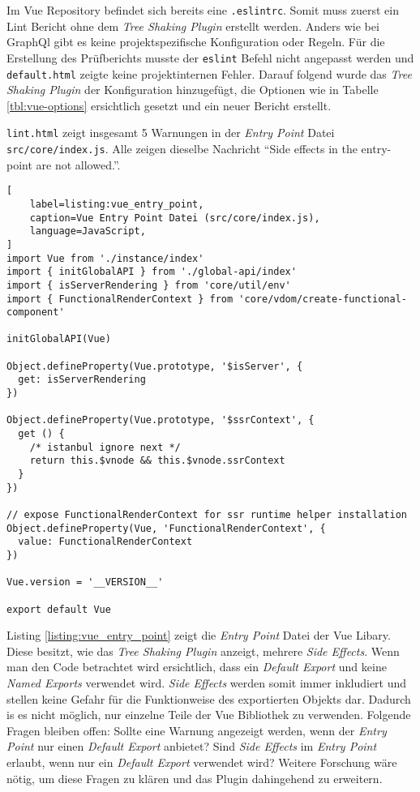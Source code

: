 Im Vue Repository befindet sich bereits eine \lstinline{.eslintrc}. Somit muss zuerst ein Lint Bericht ohne dem \textit{Tree Shaking Plugin} erstellt werden. Anders wie bei GraphQl gibt es keine projektspezifische Konfiguration oder Regeln. Für die Erstellung des Prüfberichts musste der \lstinline{eslint} Befehl nicht angepasst werden und \lstinline{default.html} zeigte keine projektinternen Fehler. Darauf folgend wurde das \textit{Tree Shaking Plugin} der Konfiguration hinzugefügt, die Optionen wie in Tabelle \ref{tbl:vue-options} ersichtlich gesetzt und ein neuer Bericht erstellt.

\lstinline{lint.html} zeigt insgesamt 5 Warnungen in der \textit{Entry Point} Datei \lstinline{src/core/index.js}. Alle zeigen dieselbe Nachricht ``Side effects in the entry-point are not allowed.''.

\begin{lstlisting}[
    label=listing:vue_entry_point,
	caption=Vue Entry Point Datei (src/core/index.js),
	language=JavaScript,
]
import Vue from './instance/index'
import { initGlobalAPI } from './global-api/index'
import { isServerRendering } from 'core/util/env'
import { FunctionalRenderContext } from 'core/vdom/create-functional-component'

initGlobalAPI(Vue)

Object.defineProperty(Vue.prototype, '$isServer', {
  get: isServerRendering
})

Object.defineProperty(Vue.prototype, '$ssrContext', {
  get () {
    /* istanbul ignore next */
    return this.$vnode && this.$vnode.ssrContext
  }
})

// expose FunctionalRenderContext for ssr runtime helper installation
Object.defineProperty(Vue, 'FunctionalRenderContext', {
  value: FunctionalRenderContext
})

Vue.version = '__VERSION__'

export default Vue
\end{lstlisting}

Listing \ref{listing:vue_entry_point} zeigt die \textit{Entry Point} Datei der Vue Libary. Diese besitzt, wie das \textit{Tree Shaking Plugin} anzeigt, mehrere \textit{Side Effects}. Wenn man den Code betrachtet wird ersichtlich, dass ein \textit{Default Export} und keine \textit{Named Exports} verwendet wird. \textit{Side Effects} werden somit immer inkludiert und stellen keine Gefahr für die Funktionweise des exportierten Objekts dar. Dadurch is es nicht möglich, nur einzelne Teile der Vue Bibliothek zu verwenden. Folgende Fragen bleiben offen: Sollte eine Warnung angezeigt werden, wenn der \textit{Entry Point} nur einen \textit{Default Export} anbietet? Sind \textit{Side Effects} im \textit{Entry Point} erlaubt, wenn nur ein \textit{Default Export} verwendet wird? Weitere Forschung wäre nötig, um diese Fragen zu klären und das Plugin dahingehend zu erweitern. 

